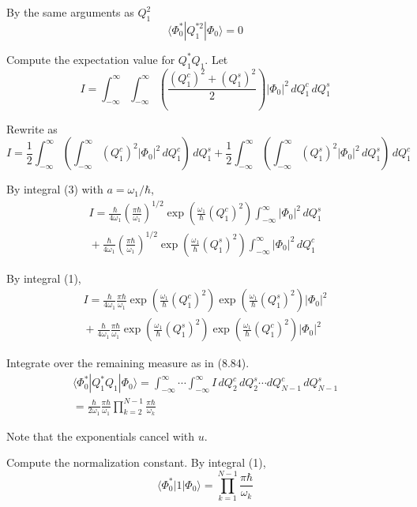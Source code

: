 \documentclass[12pt]{article}
\newcommand\U{\vert\Phi_0\vert^2}
\begin{document}
By the same arguments as $Q_1^2$
\begin{equation*}
\langle\Phi_0^*|Q_1^{*2}|\Phi_0\rangle=0
\end{equation*}

Compute the expectation value for $Q_1^*Q_1$.
Let
\begin{equation*}
I=\int_{-\infty}^\infty\int_{-\infty}^\infty
\left(\frac{(Q_1^c)^2+(Q_1^s)^2}{2}\right)
\U\,dQ_1^c\,dQ_1^s
\end{equation*}

Rewrite as
\begin{equation*}
I=\frac{1}{2}\int_{-\infty}^\infty\left(\int_{-\infty}^\infty (Q_1^c)^2
\U\,dQ_1^c\right)\,dQ_1^s
+\frac{1}{2}\int_{-\infty}^\infty\left(\int_{-\infty}^\infty (Q_1^s)^2
\U\,dQ_1^s\right)\,dQ_1^c
\end{equation*}

By integral (3) with $a=\omega_1/\hbar$,
\begin{multline*}
I=
\frac{\hbar}{4\omega_1}
\left(\frac{\pi\hbar}{\omega_1}\right)^{1/2}
\exp\left(\frac{\omega_1}{\hbar}(Q_1^c)^2\right)
\int_{-\infty}^\infty
\U\,dQ_1^s
\\
{}+\frac{\hbar}{4\omega_1}
\left(\frac{\pi\hbar}{\omega_1}\right)^{1/2}
\exp\left(\frac{\omega_1}{\hbar}(Q_1^s)^2\right)
\int_{-\infty}^\infty
\U\,dQ_1^c
\end{multline*}

By integral (1),
\begin{multline*}
I=
\frac{\hbar}{4\omega_1}
\frac{\pi\hbar}{\omega_1}
\exp\left(\frac{\omega_1}{\hbar}(Q_1^c)^2\right)
\exp\left(\frac{\omega_1}{\hbar}(Q_1^s)^2\right)
\U
\\
{}+
\frac{\hbar}{4\omega_1}
\frac{\pi\hbar}{\omega_1}
\exp\left(\frac{\omega_1}{\hbar}(Q_1^s)^2\right)
\exp\left(\frac{\omega_1}{\hbar}(Q_1^c)^2\right)
\U
\end{multline*}

Integrate over the remaining measure as in (8.84).
\begin{multline*}
\langle\Phi_0^*|Q_1^*Q_1|\Phi_0\rangle
=\int_{-\infty}^\infty\cdots\int_{-\infty}^\infty I\,dQ_2^c\,dQ_2^s\cdots dQ_{N-1}^c\,dQ_{N-1}^s
\\
=\frac{\hbar}{2\omega_1}
\frac{\pi\hbar}{\omega_1}
\prod_{k=2}^{N-1}\frac{\pi\hbar}{\omega_k}
\tag{7}
\end{multline*}

Note that the exponentials cancel with $u$.

\bigskip
Compute the normalization constant.
By integral (1),
\begin{equation*}
\langle\Phi_0^*|1|\Phi_0\rangle
=\prod_{k=1}^{N-1}\frac{\pi\hbar}{\omega_k}
\tag{8}
\end{equation*}
\end{document}
